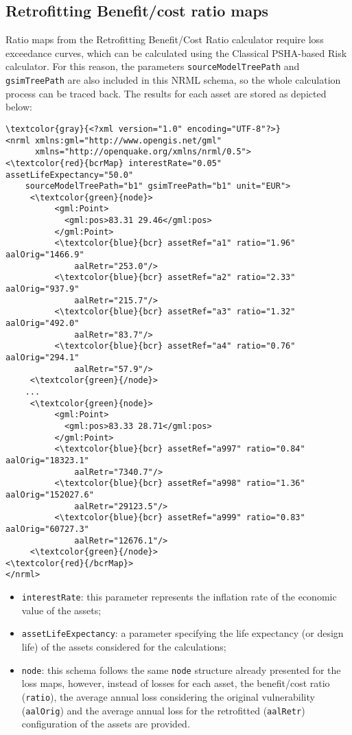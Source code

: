 \subsection{Retrofitting Benefit/cost ratio maps}

Ratio maps from the Retrofitting Benefit/Cost Ratio calculator require loss
exceedance curves, which can be calculated using the Classical PSHA-based Risk
calculator. For this reason, the parameters \Verb+sourceModelTreePath+ and
\Verb+gsimTreePath+ are also included in this NRML schema, so the whole
calculation process can be traced back. The results for each \gls{asset} are
stored as depicted below:

\begin{Verbatim}[frame=single, commandchars=\\\{\}, samepage=false]
\textcolor{gray}{<?xml version="1.0" encoding="UTF-8"?>}
<nrml xmlns:gml="http://www.opengis.net/gml"
      xmlns="http://openquake.org/xmlns/nrml/0.5">
<\textcolor{red}{bcrMap} interestRate="0.05" assetLifeExpectancy="50.0"
    sourceModelTreePath="b1" gsimTreePath="b1" unit="EUR">
     <\textcolor{green}{node}>
          <gml:Point>
            <gml:pos>83.31 29.46</gml:pos>
          </gml:Point>
          <\textcolor{blue}{bcr} assetRef="a1" ratio="1.96" aalOrig="1466.9"
              aalRetr="253.0"/>
          <\textcolor{blue}{bcr} assetRef="a2" ratio="2.33" aalOrig="937.9"
              aalRetr="215.7"/>
          <\textcolor{blue}{bcr} assetRef="a3" ratio="1.32" aalOrig="492.0"
              aalRetr="83.7"/>
          <\textcolor{blue}{bcr} assetRef="a4" ratio="0.76" aalOrig="294.1"
              aalRetr="57.9"/>
     <\textcolor{green}{/node}>
    ...
     <\textcolor{green}{node}>
          <gml:Point>
            <gml:pos>83.33 28.71</gml:pos>
          </gml:Point>
          <\textcolor{blue}{bcr} assetRef="a997" ratio="0.84" aalOrig="18323.1"
              aalRetr="7340.7"/>
          <\textcolor{blue}{bcr} assetRef="a998" ratio="1.36" aalOrig="152027.6"
              aalRetr="29123.5"/>
          <\textcolor{blue}{bcr} assetRef="a999" ratio="0.83" aalOrig="60727.3"
              aalRetr="12676.1"/>
     <\textcolor{green}{/node}>
<\textcolor{red}{/bcrMap}>
</nrml>
\end{Verbatim}

\begin{itemize}
\item  \Verb+interestRate+: this parameter represents the inflation rate of the economic value of the \glspl{asset};
\item  \Verb+assetLifeExpectancy+: a parameter specifying the life expectancy (or design life) of the \glspl{asset} considered for the calculations;
\item  \Verb+node+: this schema follows the same \Verb+node+ structure already presented for the loss maps, however, instead of losses for each \gls{asset}, the benefit/cost ratio (\Verb+ratio+), the average annual loss considering the original vulnerability (\Verb+aalOrig+) and the average annual loss for the retrofitted (\Verb+aalRetr+) configuration  of the \glspl{asset} are provided.
\end{itemize}

